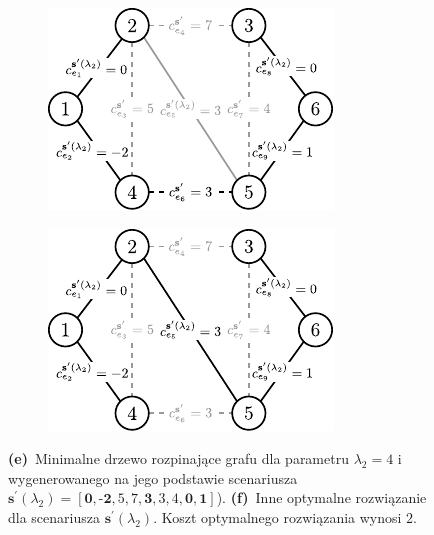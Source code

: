 \begin{figure}[!htbp]
	\ContinuedFloat
	\null\hfill
	\begin{subfigure}[b]{0.32\textwidth}
		\includegraphics[width=\textwidth]{Chapter_IV/INC-MST-example/d1}
		\caption{}
		\label{fig:imstExample:e}
	\end{subfigure}
	\hfill
	\begin{subfigure}[b]{0.32\textwidth}
		\includegraphics[width=\textwidth]{Chapter_IV/INC-MST-example/d2}
		\caption{}
		\label{fig:imstExample:f}
	\end{subfigure}
	\hfill\null
	\caption{
		\textbf{(e)}~Minimalne drzewo rozpinające grafu dla parametru $\lambda_{2} = 4$ i wygenerowanego na jego podstawie scenariusza $\textbf{s}^{\prime} \left( \lambda_{2} \right) = \left[ \textbf{0}, \textbf{-2}, 5, 7, \textbf{3}, 3, 4, \textbf{0}, \textbf{1} \right]$).
		\textbf{(f)}~Inne optymalne rozwiązanie dla scenariusza $\textbf{s}^{\prime} \left( \lambda_{2} \right)$. Koszt optymalnego rozwiązania wynosi $2$.
	}
	\label{fig:imstExample}
\end{figure}


